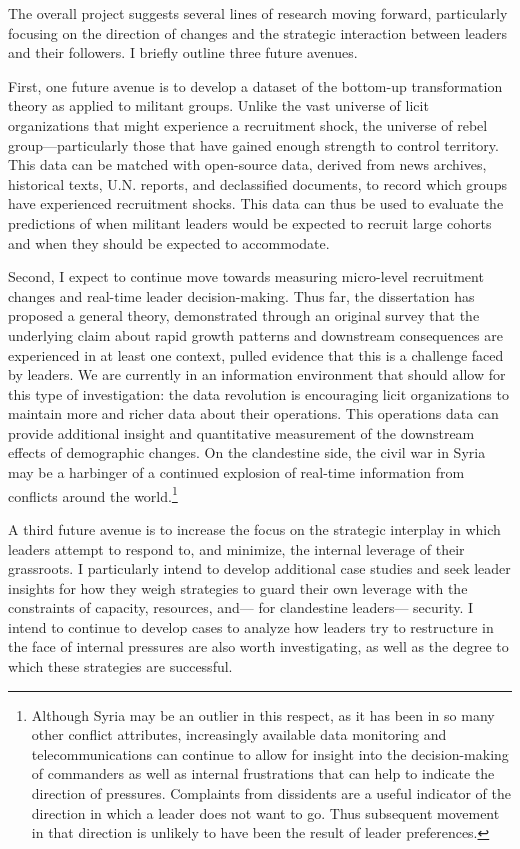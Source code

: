 The overall project suggests several lines of research moving forward, particularly focusing on the direction of changes and the strategic interaction between leaders and their followers. I briefly outline three future avenues.

First, one future avenue is to develop a dataset of the bottom-up transformation theory as applied to militant groups. Unlike the vast universe of licit organizations that might experience a recruitment shock, the universe of rebel group---particularly those that have gained enough strength to control territory. This data can be matched with open-source data, derived from news archives, historical texts, U.N. reports, and declassified documents, to record which groups have experienced recruitment shocks. This data can thus be used to evaluate the predictions of when militant leaders would be expected to recruit large cohorts and when they should be expected to accommodate. 

Second, I expect to continue move towards measuring micro-level recruitment changes and real-time leader decision-making. Thus far, the dissertation has proposed a general theory, demonstrated through an original survey that the underlying claim about rapid growth patterns and downstream consequences are experienced in at least one context, pulled evidence that this is a challenge faced by leaders.  We are currently in an information environment that should allow for this type of investigation: the data revolution is encouraging licit organizations to maintain more and richer data about their operations. This operations data can provide additional insight and quantitative measurement of the downstream effects of demographic changes. On the clandestine side, the civil war in Syria may be a harbinger of a continued explosion of real-time information from conflicts around the world.\footnote{Although Syria may be an outlier in this respect, as it has been in so many other conflict attributes, increasingly available data monitoring and telecommunications can continue to allow for insight into the decision-making of commanders as well as internal frustrations that can help to indicate the direction of pressures. Complaints from dissidents are a useful indicator of the direction in which a leader does not want to go. Thus subsequent movement in that direction is unlikely to have been the result of leader preferences.}  

A third future avenue is to increase the focus on the strategic interplay in which leaders attempt to respond to, and minimize, the internal leverage of their grassroots.  I particularly intend to develop additional case studies and seek leader insights for how they weigh strategies to guard their own leverage with the constraints of capacity, resources, and--- for clandestine leaders--- security. I intend to continue to develop cases to analyze how leaders try to restructure in the face of internal pressures are also worth investigating, as well as the degree to which these strategies are successful. 
